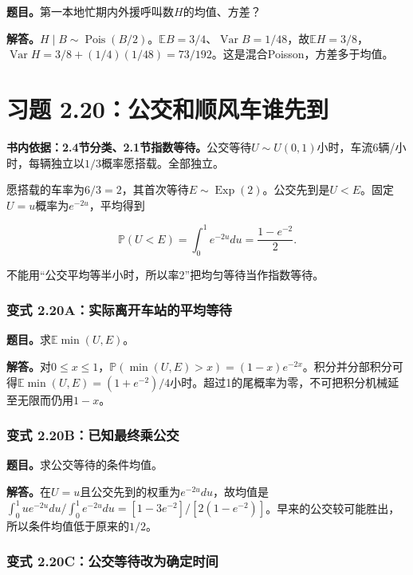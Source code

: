 \documentclass[12pt,a4paper,UTF8,fontset=fandol]{ctexart}
\begin{document}
\textbf{题目。}第一本地忙期内外援呼叫数\(H\)的均值、方差？

\textbf{解答。}\(H\mid B\sim\operatorname{Pois}(B/2)\)。\(\mathbb EB=3/4\)、\(\operatorname{Var}B=1/48\)，故\(\mathbb EH=3/8\)，\(\operatorname{Var}H=3/8+(1/4)(1/48)=73/192\)。这是混合Poisson，方差多于均值。

\section{习题
2.20：公交和顺风车谁先到}\label{ux4e60ux9898-2.20ux516cux4ea4ux548cux987aux98ceux8f66ux8c01ux5148ux5230}

\textbf{书内依据：2.4节分类、2.1节指数等待。}公交等待\(U\sim U(0,1)\)小时，车流6辆/小时，每辆独立以\(1/3\)概率愿搭载。全部独立。

愿搭载的车率为\(6/3=2\)，其首次等待\(E\sim\operatorname{Exp}(2)\)。公交先到是\(U<E\)。固定\(U=u\)概率为\(e^{-2u}\)，平均得到

\[\boxed{\mathbb P(U<E)=\int_0^1e^{-2u}du=\frac{1-e^{-2}}2.}\]

不能用``公交平均等半小时，所以率2''把均匀等待当作指数等待。

\subsubsection{变式
2.20A：实际离开车站的平均等待}\label{ux53d8ux5f0f-2.20aux5b9eux9645ux79bbux5f00ux8f66ux7ad9ux7684ux5e73ux5747ux7b49ux5f85}

\textbf{题目。}求\(\mathbb E\min(U,E)\)。

\textbf{解答。}对\(0\le x\le1\)，\(\mathbb P(\min(U,E)>x)=(1-x)e^{-2x}\)。积分并分部积分可得\(\mathbb E\min(U,E)=(1+e^{-2})/4\)小时。超过1的尾概率为零，不可把积分机械延至无限而仍用\(1-x\)。

\subsubsection{变式
2.20B：已知最终乘公交}\label{ux53d8ux5f0f-2.20bux5df2ux77e5ux6700ux7ec8ux4e58ux516cux4ea4}

\textbf{题目。}求公交等待的条件均值。

\textbf{解答。}在\(U=u\)且公交先到的权重为\(e^{-2u}du\)，故均值是\(\int_0^1ue^{-2u}du/\int_0^1e^{-2u}du=[1-3e^{-2}]/[2(1-e^{-2})]\)。早来的公交较可能胜出，所以条件均值低于原来的\(1/2\)。

\subsubsection{变式
2.20C：公交等待改为确定时间}\label{ux53d8ux5f0f-2.20cux516cux4ea4ux7b49ux5f85ux6539ux4e3aux786eux5b9aux65f6ux95f4}
\end{document}
